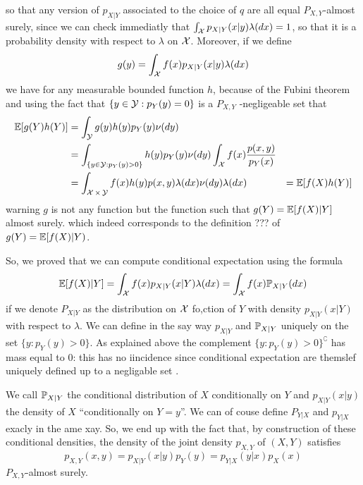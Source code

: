 so that any version of $p_{X | Y}$ associated to the choice of $q$ are all equal $P_{X, Y}$-almost surely, since we can check immediatly that $\int_{\cX} p_{X | Y}(x | y) \lambda(dx) = 1$, so that it is a probability density with respect to $\lambda$ on $\cX$.
Moreover, if we define
\begin{equation*}
	g(y) = \int_{\cX} f(x) p_{X | Y}(x | y) \lambda(dx)
\end{equation*}
we have for any measurable bounded function $h$, because of the Fubini theorem and using the fact that $\{y \in \cY : p_Y(y) = 0\}$ is a $P_{X, Y}$ -negligeable set that
\begin{align*}
	\E[ g(Y) h(Y)] &= \int_{\cY} g(y) h(y) p_Y(y) \nu(dy) \\
	&= \int_{\{ y \in \cY : p_Y(y) > 0 \}} h(y) p_Y(y) \nu(dy) \int_{\cX} f(x) \frac{p(x, y)}{p_Y(x)} \\
	&= \int_{\cX \times \cY} f(x) h(y) p(x, y) \lambda(dx) \nu(dy) \lambda (dx)
	&= \E[ f(X) h(Y)]
\end{align*}
warning $g$ is not any function but the function such that $g(Y) = \E[ f(X) | Y]$ almost surely.
which indeed corresponds to the definition ??? of $g(Y) = \E[f(X) | Y)$.

So, we proved that we can compute conditional expectation using the formula
\begin{equation*}
	\E[f(X) | Y] = \int_{\cX} f(x) p_{X | Y}(x | Y) \lambda(dx) = \int_{\cX} f(x) \P_{X | Y} (dx)
\end{equation*}
if we denote $P_{X | Y}$ as the distribution on $\cX$ fo,ction of $Y$ with density $p_{X | Y}(x | Y)$ with respect to $\lambda$. 
We can define in the say way $p_{X | Y}$ and $\P_{X | Y}$ uniquely on the set $\{ y : p_Y(y) > 0 \}$.
As explained above the complement $\{ y : p_Y(y) > 0 \}^\complement$ has mass equal to $0$: this has no iincidence since conditional expectation are themslef uniquely defined up to a negligable set .

We call $\P_{X | Y}$ the conditional distribution of $X$ conditionally on $Y$ and $p_{X | Y}(x | y)$ the density of $X$ ``conditionally on $Y=y$''. We can of couse define $P_{Y | X}$ and $p_{Y | X}$ exacly in the ame xay.
So, we end up with the fact that, by construction of these conditional densities, the density of the joint density $p_{X, Y}$ of $(X, Y)$  satisfies
\begin{equation}
	\label{eq:cond-density-formula}
	p_{X, Y}(x, y) = p_{X | Y}(x | y) p_Y(y) = p_{Y | X}(y | x) p_X(x)
\end{equation}
$P_{X, Y}$-almost surely.

